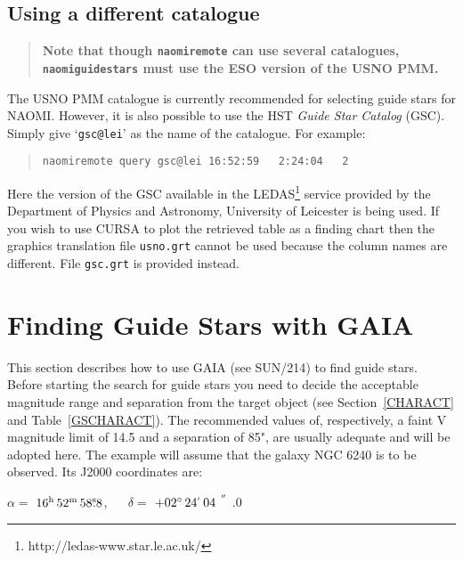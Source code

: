 \documentclass[twoside,11pt]{article}
\newcommand{\arcsec} {$\hspace{-0.05em}\raisebox{-0.5ex}
                     {$^{'\hspace{-0.1em}'}$}
                     \hspace{-0.7em}.\hspace{-0.05em}$}
\newcommand{\tsec}   {\mbox{$^{\rm s}\!\!.$}}
\newcommand{\hms}[4] {$#1^{\rm h}\,#2^{\rm m}\,#3\tsec#4$}
\newcommand{\dms}[4] {$#1^{\circ}\,#2\raisebox{-0.5ex}{$^{'}$}\,#3\arcsec#4$}
\newcommand{\htmladdnormallinkfoot}[2]{#1\footnote{#2}}
\newcommand{\xref}[3]{#1}
\newcommand{\xlabel}[1]{}
\renewcommand{\_}{\texttt{\symbol{95}}}
\begin{document}
\subsection{Using a different catalogue}

\begin{quote}
{\bf Note that though {\tt naomiremote} can use several catalogues,
{\tt naomiguidestars} must use the ESO version of the USNO PMM.}
\end{quote}

The USNO PMM catalogue\cite{PMM} is currently recommended for selecting
guide stars for NAOMI.  However, it is also possible to use the HST {\it
Guide Star Catalog}\/ (GSC).  Simply give `{\tt gsc@lei}' as the name of
the catalogue.  For example:

\begin{quote}
{\tt naomiremote query gsc@lei 16:52:59 ~ 2:24:04 ~ 2}
\end{quote}

Here the version of the GSC available in the 
\htmladdnormallinkfoot{LEDAS}{http://ledas-www.star.le.ac.uk/}
service provided by the Department of Physics and Astronomy, University of
Leicester is being used.  If you wish to use CURSA to plot the retrieved
table as a finding chart then the graphics translation file {\tt usno.grt}
cannot be used because the column names are different.  File {\tt gsc.grt}
is provided instead.



\newpage
\section{\xlabel{GAIA}\label{GAIA}Finding Guide Stars with GAIA}

This section describes how to use GAIA (see
\xref{SUN/214}{sun214}{}\cite{SUN214}) to find guide stars.  Before
starting the search for guide stars you need to decide the acceptable
magnitude range and separation from the target object (see
Section~\ref{CHARACT} and Table~\ref{GSCHARACT}).  The recommended values
of, respectively, a faint V magnitude limit of 14.5 and a separation of 85",
are usually adequate and will be adopted here.  The example will assume
that the galaxy NGC 6240 is to be observed.  Its J2000 coordinates are:

\begin{center}
$\alpha =$ \hms{16}{52}{58}{8}, ~~ $\delta =$ \dms{+02}{24}{04}{0}
\end{center}
\end{document}
